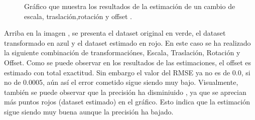 \begin{figure}
\begin{center}
\hspace{0.5cm}

\end{center}

\caption{Gráfico que muestra los resultados de la estimación de un cambio de escala, traslación,rotación y offset .}
\end{figure}

Arriba en la imagen , se presenta el dataset original en verde, el dataset transformado en azul y el dataset estimado en rojo.
En este caso se ha realizado la siguiente combinación de transformaciónes, Escala, Traslación, Rotación y Offset.
Como se puede observar en los resultados de las estimaciones, el offset es estimado con total exactitud. Sin embargo el valor del RMSE ya no es de 0.0, si no de 0.0005, aún así el error cometido sigue siendo muy bajo.
Visualmente, también se puede observar que la precisión ha disminiuido , ya que se aprecian más puntos rojos (dataset estimado) en el gráfico. Esto indica que la estimación sigue siendo muy buena aunque la precisión ha bajado.


